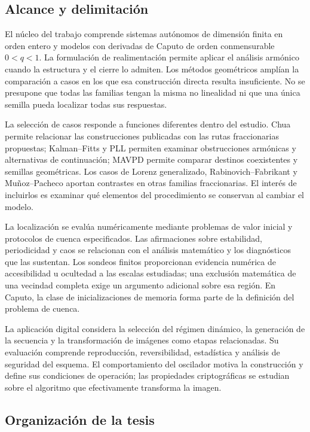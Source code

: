 \subsection{Alcance y delimitación}
\label{sec:cap1-alcance}

El núcleo del trabajo comprende sistemas autónomos de dimensión finita
en orden entero y modelos con derivadas de Caputo de orden conmensurable
\(0<q<1\). La formulación de realimentación permite aplicar el análisis
armónico cuando la estructura y el cierre lo admiten. Los métodos
geométricos amplían la comparación a casos en los que esa construcción
directa resulta insuficiente. No se presupone que todas las familias
tengan la misma no linealidad ni que una única semilla pueda localizar
todas sus respuestas.

La selección de casos responde a funciones diferentes dentro del estudio.
Chua permite relacionar las construcciones publicadas con las rutas
fraccionarias propuestas; Kalman--Fitts y PLL permiten examinar
obstrucciones armónicas y alternativas de continuación; MAVPD permite
comparar destinos coexistentes y semillas geométricas. Los casos de
Lorenz generalizado, Rabinovich--Fabrikant y Muñoz--Pacheco aportan
contrastes en otras familias fraccionarias. El interés de incluirlos es
examinar qué elementos del procedimiento se conservan al cambiar el modelo.

La localización se evalúa numéricamente mediante problemas de valor
inicial y protocolos de cuenca especificados. Las afirmaciones sobre
estabilidad, periodicidad y caos se relacionan con el análisis matemático
y los diagnósticos que las sustentan. Los sondeos finitos proporcionan
evidencia numérica de accesibilidad u ocultedad a las escalas estudiadas;
una exclusión matemática de una vecindad completa exige un argumento
adicional sobre esa región. En Caputo, la clase de inicializaciones de
memoria forma parte de la definición del problema de cuenca.

La aplicación digital considera la selección del régimen dinámico, la
generación de la secuencia y la transformación de imágenes como etapas
relacionadas. Su evaluación comprende reproducción, reversibilidad,
estadística y análisis de seguridad del esquema. El comportamiento del
oscilador motiva la construcción y define sus condiciones de operación;
las propiedades criptográficas se estudian sobre el algoritmo que
efectivamente transforma la imagen.

\subsection{Organización de la tesis}
\label{sec:cap1-organizacion}

